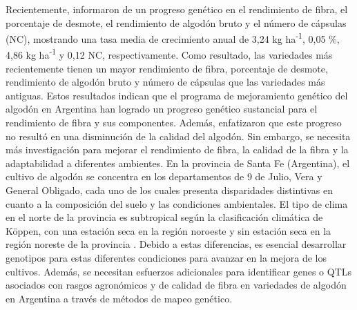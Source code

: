 \documentclass[12pt,oneside]{reedthesis}
\begin{document}
Recientemente, \textcite{scarpin2022} informaron de un progreso genético en el rendimiento de fibra, el porcentaje de desmote, el rendimiento de algodón bruto y el número de cápsulas (NC), mostrando una tasa media de crecimiento anual de 3,24 kg ha\textsuperscript{-1}, 0,05 \%, 4,86 kg ha\textsuperscript{-1} y 0,12 NC, respectivamente. Como resultado, las variedades más recientemente tienen un mayor rendimiento de fibra, porcentaje de desmote, rendimiento de algodón bruto y número de cápsulas que las variedades más antiguas. Estos resultados indican que el programa de mejoramiento genético del algodón en Argentina han logrado un progreso genético sustancial para el rendimiento de fibra y sus componentes. Además, \textcite{scarpin2023} enfatizaron que este progreso no resultó en una disminución de la calidad del algodón. Sin embargo, se necesita más investigación para mejorar el rendimiento de fibra, la calidad de la fibra y la adaptabilidad a diferentes ambientes. En la provincia de Santa Fe (Argentina), el cultivo de algodón se concentra en los departamentos de 9 de Julio, Vera y General Obligado, cada uno de los cuales presenta disparidades distintivas en cuanto a la composición del suelo y las condiciones ambientales. El tipo de clima en el norte de la provincia es subtropical según la clasificación climática de Köppen, con una estación seca en la región noroeste y sin estación seca en la región noreste de la provincia \autocite{anida2024}. Debido a estas diferencias, es esencial desarrollar genotipos para estas diferentes condiciones para avanzar en la mejora de los cultivos. Además, se necesitan esfuerzos adicionales para identificar genes o QTLs asociados con rasgos agronómicos y de calidad de fibra en variedades de algodón en Argentina a través de métodos de mapeo genético.
\end{document}
